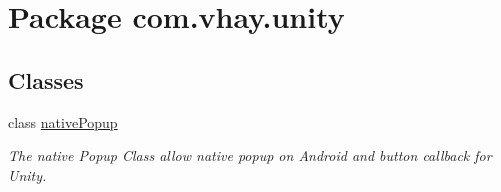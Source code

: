\hypertarget{namespacecom_1_1vhay_1_1unity}{}\section{Package com.\+vhay.\+unity}
\label{namespacecom_1_1vhay_1_1unity}
\subsection*{Classes}
\begin{DoxyCompactItemize}
\item 
class \mbox{\hyperlink{classcom_1_1vhay_1_1unity_1_1native_popup}{native\+Popup}}
\begin{DoxyCompactList}\small\item\em The native Popup Class allow native popup on Android and button callback for Unity. \end{DoxyCompactList}\end{DoxyCompactItemize}
